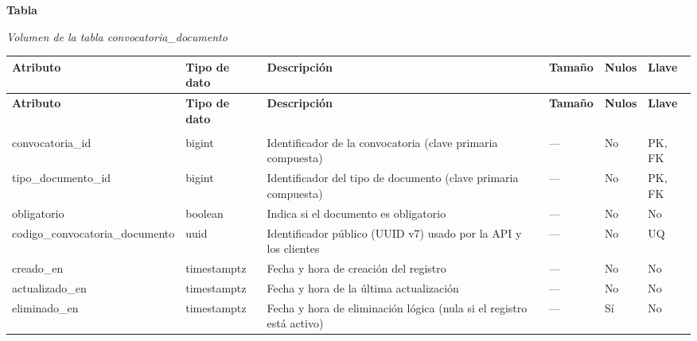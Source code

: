 \label{tab:volumen_convocatoria_documento}
\noindent\textbf{Tabla~\thetable}\par\nopagebreak
\noindent\textit{Volumen de la tabla convocatoria\_\allowbreak{}documento}\par\nopagebreak
\begingroup\small\linespread{1}\selectfont\setlength{\tabcolsep}{4pt}
\begin{longtable}{>{\raggedright\arraybackslash}p{3.4cm} >{\raggedright\arraybackslash}p{2.5cm} >{\raggedright\arraybackslash}p{4.8cm} >{\centering\arraybackslash}p{1.6cm}>{\centering\arraybackslash}p{1.1cm} >{\centering\arraybackslash}p{1.3cm}}
\toprule
\textbf{Atributo} & \textbf{Tipo de dato} & \textbf{Descripción} & \textbf{Tamaño} & \textbf{Nulos} & \textbf{Llave} \\
\midrule
\endfirsthead
\toprule
\textbf{Atributo} & \textbf{Tipo de dato} & \textbf{Descripción} & \textbf{Tamaño} & \textbf{Nulos} & \textbf{Llave} \\
\midrule
\endhead
\endfoot
\bottomrule
\multicolumn{6}{l}{\textit{Nota.} Elaboración propia.} \\
\endlastfoot
convocatoria\_\allowbreak{}id & bigint & Identificador de la convocatoria (clave primaria compuesta) & — & No & PK, FK \\
tipo\_\allowbreak{}documento\_\allowbreak{}id & bigint & Identificador del tipo de documento (clave primaria compuesta) & — & No & PK, FK \\
obligatorio & boolean & Indica si el documento es obligatorio & — & No & No \\
codigo\_\allowbreak{}convocatoria\_\allowbreak{}documento & uuid & Identificador público (UUID v7) usado por la API y los clientes & — & No & UQ \\
creado\_\allowbreak{}en & timestamptz & Fecha y hora de creación del registro & — & No & No \\
actualizado\_\allowbreak{}en & timestamptz & Fecha y hora de la última actualización & — & No & No \\
eliminado\_\allowbreak{}en & timestamptz & Fecha y hora de eliminación lógica (nula si el registro está activo) & — & Sí & No \\
\end{longtable}
\endgroup
\addtocounter{table}{-1}

